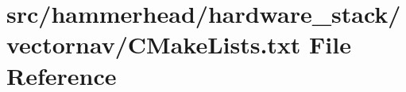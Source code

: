 \hypertarget{hardware__stack_2vectornav_2CMakeLists_8txt}{}\section{src/hammerhead/hardware\+\_\+stack/vectornav/\+C\+Make\+Lists.txt File Reference}
\label{hardware__stack_2vectornav_2CMakeLists_8txt}

